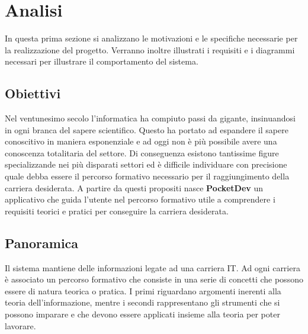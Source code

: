 \section{Analisi}
In questa prima sezione si analizzano le motivazioni e le specifiche necessarie per la realizzazione del progetto. Verranno inoltre illustrati i requisiti e i diagrammi necessari per illustrare il comportamento del sistema.
\subsection{Obiettivi}
Nel ventunesimo secolo l'informatica ha compiuto passi da gigante, insinuandosi in ogni branca del sapere scientifico. Questo ha portato ad espandere il sapere conoscitivo in maniera esponenziale e ad oggi non è più possibile avere una conoscenza totalitaria del settore. Di conseguenza esistono tantissime figure specializzande nei più disparati settori ed è difficile individuare con precisione quale debba essere il percorso formativo necessario per il raggiungimento della carriera desiderata. A partire da questi propositi nasce \textbf{PocketDev} un applicativo che guida l'utente nel percorso formativo utile a comprendere i requisiti teorici e pratici per conseguire la carriera desiderata.
\subsection{Panoramica}
Il sistema mantiene delle informazioni legate ad una carriera IT. Ad ogni carriera è associato un percorso formativo che consiste in una serie di concetti che possono essere di natura teorica o pratica. I primi riguardano argomenti inerenti alla teoria dell'informazione, mentre i secondi rappresentano gli strumenti che si possono imparare e che devono essere applicati insieme alla teoria per poter lavorare.
